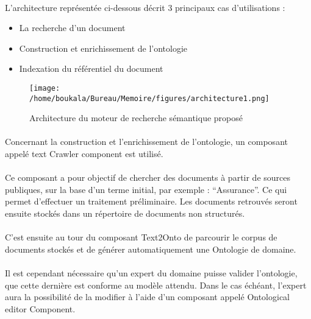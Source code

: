 \documentclass[12pt, a4paper, oneside]{book}
\begin{document}
\paragraph{}
L'architecture représentée ci-dessous décrit 3 principaux cas d'utilisations :
\begin{itemize}
\item La recherche d'un document
\item Construction et enrichissement de l'ontologie
\item Indexation du référentiel du document
\end{itemize}


\begin{figure}[h!]
\begin{center}
\texttt{[image: /home/boukala/Bureau/Memoire/figures/architecture1.png]}
\caption{Architecture du moteur de recherche sémantique proposé}
\end{center}
\end{figure}






\paragraph{}
Concernant la construction et l'enrichissement de l'ontologie, un composant appelé text Crawler component est utilisé.
\paragraph{}
Ce composant a pour objectif de chercher des documents à partir de sources publiques, sur la base d'un terme initial, par exemple : “Assurance”. Ce qui permet d'effectuer un traitement préliminaire.
Les documents retrouvés seront ensuite stockés dans un répertoire de documents non structurés.
\paragraph{}
C'est ensuite au tour du composant Text2Onto de parcourir le corpus de documents stockés et de générer automatiquement une Ontologie de domaine.
\paragraph{}
Il est cependant nécessaire qu'un expert du domaine puisse valider l'ontologie, que cette dernière est conforme au modèle attendu. Dans le cas échéant, l'expert aura la possibilité de la modifier à l'aide d'un composant appelé Ontological editor Component.
                                           
\end{document}
